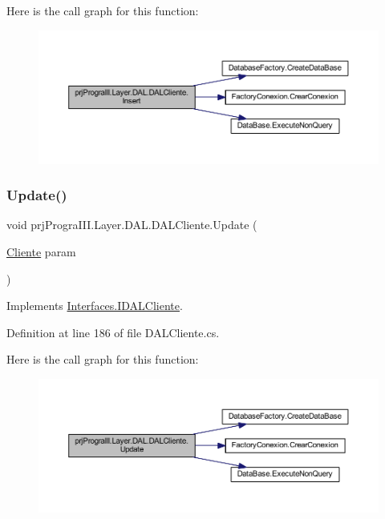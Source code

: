 Here is the call graph for this function\+:
\nopagebreak
\begin{figure}[H]
\begin{center}
\leavevmode
\includegraphics[width=350pt]{classprj_progra_i_i_i_1_1_layer_1_1_d_a_l_1_1_d_a_l_cliente_ab9646dc3260db65cb7baf86ed33e3d70_cgraph}
\end{center}
\end{figure}
\hypertarget{classprj_progra_i_i_i_1_1_layer_1_1_d_a_l_1_1_d_a_l_cliente_abced90e9e9a3314ee0af02dc6871f9ce}{}\label{classprj_progra_i_i_i_1_1_layer_1_1_d_a_l_1_1_d_a_l_cliente_abced90e9e9a3314ee0af02dc6871f9ce} 
\subsubsection{\texorpdfstring{Update()}{Update()}}
{\footnotesize\ttfamily void prj\+Progra\+I\+I\+I.\+Layer.\+D\+A\+L.\+D\+A\+L\+Cliente.\+Update (\begin{DoxyParamCaption}\item[{\hyperlink{classprj_progra_i_i_i_1_1_layer_1_1_entities_1_1_cliente}{Cliente}}]{param }\end{DoxyParamCaption})}



Implements \hyperlink{interface_interfaces_1_1_i_d_a_l_cliente_abe4143d07e9223b242e52e3b486f2c33}{Interfaces.\+I\+D\+A\+L\+Cliente}.



Definition at line 186 of file D\+A\+L\+Cliente.\+cs.

Here is the call graph for this function\+:
\nopagebreak
\begin{figure}[H]
\begin{center}
\leavevmode
\includegraphics[width=350pt]{classprj_progra_i_i_i_1_1_layer_1_1_d_a_l_1_1_d_a_l_cliente_abced90e9e9a3314ee0af02dc6871f9ce_cgraph}
\end{center}
\end{figure}


